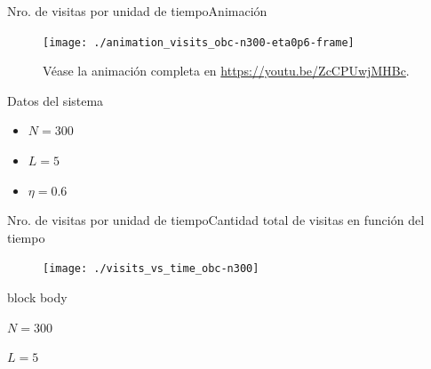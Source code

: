 \documentclass{beamer}
\begin{document}
            \begin{frame}{Nro. de visitas por unidad de tiempo}{Animación}
                \begin{minipage}[t]{0.60\textwidth}
                    \begin{figure}[H!]
                        \texttt{[image: ./animation\_visits\_obc-n300-eta0p6-frame]}
                        \caption*{Véase la animación completa en \url{https://youtu.be/ZcCPUwjMHBc}.}
                        \label{fig:obc_1}
                    \end{figure}
                \end{minipage}
                \hfill
                \begin{minipage}[t]{0.30\textwidth}
                    \begin{block}{Datos del sistema}
                        \begin{itemize}
                            \item $N=300$
                            \item $L=5$
                            \item $\eta=0.6$
                        \end{itemize}
                    \end{block}
                \end{minipage}
            \end{frame}

            \begin{frame}{Nro. de visitas por unidad de tiempo}{Cantidad total de visitas en función del tiempo}
                \begin{figure}[H!]
                    \texttt{[image: ./visits\_vs\_time\_obc-n300]}
                    \label{fig:obc_2}
                \end{figure}
                \begin{beamercolorbox}[sep=5pt,center]{block body}
                    \begin{minipage}[t]{0.45\textwidth}
                        \centering
                        \small{$N=300$}
                    \end{minipage}
                    \hfill
                    \begin{minipage}[t]{0.45\textwidth}
                        \centering
                        \small{$L=5$}
                    \end{minipage}
                \end{beamercolorbox}
            \end{frame}
\end{document}
